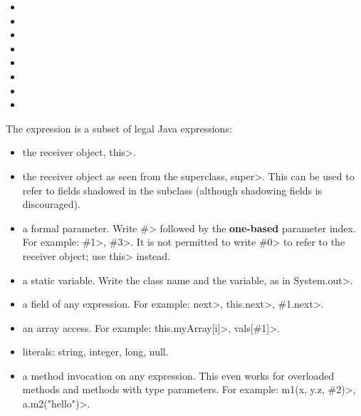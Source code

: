 \begin{itemize}
\item {}
\item {}
\item {}
\item {}
\item {}
\item {}
\item {}
\item {}
\end{itemize}

The expression is a subset of legal Java expressions:

\begin{itemize}
\item
  the receiver object, \<this>.
\item
  the receiver object as seen from the superclass, \<super>.  This can be used
  to refer to fields shadowed in the subclass (although shadowing fields is
  discouraged).
\item
  a formal parameter.  Write \<\#> followed by the \textbf{one-based} parameter
  index.  For example: \<\#1>, \<\#3>.  It is not permitted to write \<\#0> to
  refer to the receiver object; use \<this> instead.

\item
  a static variable.  Write the class name and the variable, as in
  \<System.out>.

\item
  a field of any expression.  For example:  \<next>,
  \<this.next>, \<\#1.next>. %

\item
  an array access.  For example:  \<this.myArray[i]>, \<vals[\#1]>.

\item literals: string, integer, long, null.

\item a method invocation on any expression.
  This even works for overloaded methods and methods with type parameters.
  For example:
  \<m1(x, y.z, \#2)>, \<a.m2("hello")>.

\end{itemize}

